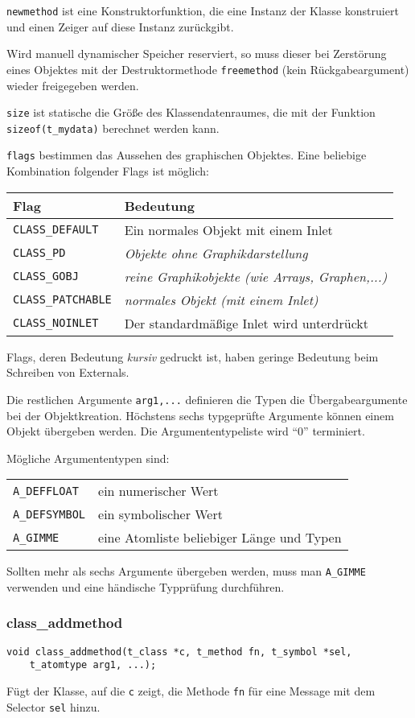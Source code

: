 \documentclass[12pt, a4paper,austrian, titlepage]{article}
\begin{document}
\begin{appendix}
\verb+newmethod+ ist eine Konstruktorfunktion,
die eine Instanz der Klasse konstruiert und einen Zeiger auf diese Instanz zurückgibt.

Wird manuell dynamischer Speicher reserviert,
so muss dieser bei Zerstörung eines Objektes
mit der Destruktormethode \verb+freemethod+ (kein Rückgabeargument)
wieder freigegeben werden.

\verb+size+ ist statische die Größe des Klassendatenraumes,
die mit der Funktion \verb+sizeof(t_mydata)+ berechnet werden kann.

\verb+flags+ bestimmen das Aussehen des graphischen Objektes.
Eine beliebige Kombination folgender Flags ist möglich:

\begin{tabular}{l|l}
Flag&Bedeutung\\
\hline
\verb+CLASS_DEFAULT+ &Ein normales Objekt mit einem Inlet \\
\verb+CLASS_PD+ & \em Objekte ohne Graphikdarstellung\\
\verb+CLASS_GOBJ+ & \em reine Graphikobjekte (wie Arrays, Graphen,...)\\
\verb+CLASS_PATCHABLE+ & \em normales Objekt (mit einem Inlet) \\
\verb+CLASS_NOINLET+ & Der standardmäßige Inlet wird unterdrückt \\
\end{tabular}

Flags, deren Bedeutung {\em kursiv} gedruckt ist,
haben geringe Bedeutung beim Schreiben von Externals.

Die restlichen Argumente \verb+arg1,...+ definieren
die Typen die Übergabeargumente bei der Objektkreation.
Höchstens sechs typgeprüfte Argumente können einem Objekt übergeben werden.
Die Argumententypeliste wird ``0'' terminiert.

Mögliche Argumententypen sind:

\begin{tabular}{l|l}
\verb+A_DEFFLOAT+ & ein numerischer Wert \\
\verb+A_DEFSYMBOL+ & ein symbolischer Wert \\
\verb+A_GIMME+ & eine Atomliste beliebiger Länge und Typen \\
\end{tabular}

Sollten mehr als sechs Argumente übergeben werden, muss man
\verb+A_GIMME+ verwenden und eine händische Typprüfung durchführen.

\subsubsection{class\_addmethod}
\begin{verbatim}
void class_addmethod(t_class *c, t_method fn, t_symbol *sel,
    t_atomtype arg1, ...);
\end{verbatim}
Fügt der Klasse, auf die \verb+c+ zeigt, die Methode \verb+fn+ für
eine Message mit dem Selector \verb+sel+ hinzu.


\end{appendix}
\end{document}
